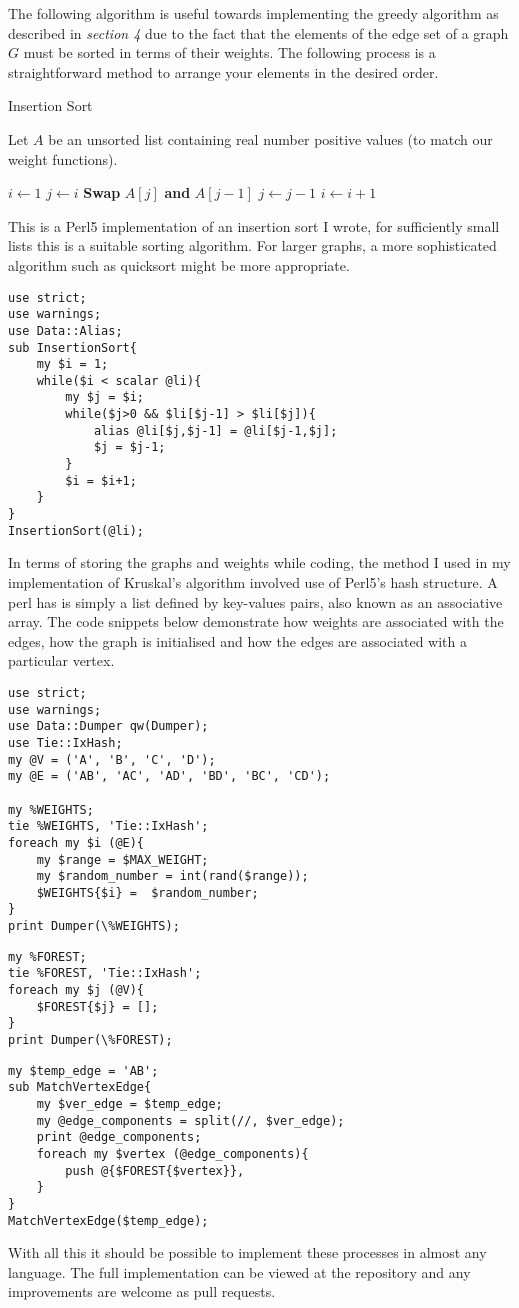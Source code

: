 \documentclass[../main.tex]{subfiles}
\begin{document}
The following algorithm is useful towards implementing the greedy algorithm as described in \textit{section 4} due to the fact that the elements of the edge set of a graph $G$ must be sorted in terms of their weights. The following process is a straightforward method to arrange your elements in the desired order.

\begin{algorithm}[H]
\caption{Insertion Sort}\label{sorting}
Let $A$ be an unsorted list containing real number positive values (to match our weight functions).
\begin{algorithmic}[1]
\State $i \gets 1$
\State $j \gets i$
	\State  \textbf{Swap} $A[j]$ \textbf{and} $A[j-1]$
	\State $j \gets j-1$	
	\EndWhile
	\State $i \gets i+1$
\EndWhile
\EndProcedure
\end{algorithmic}
\end{algorithm}
This is a Perl5 implementation of an insertion sort I wrote, for sufficiently small lists this is a suitable sorting algorithm. For larger graphs, a more sophisticated algorithm such as quicksort might be more appropriate.
\begin{lstlisting}
use strict;
use warnings;
use Data::Alias;
sub InsertionSort{
	my $i = 1;
	while($i < scalar @li){
		my $j = $i;
		while($j>0 && $li[$j-1] > $li[$j]){
			alias @li[$j,$j-1] = @li[$j-1,$j];
			$j = $j-1;
		}
		$i = $i+1;
	}
}
InsertionSort(@li);
\end{lstlisting}

In terms of storing the graphs and weights while coding, the method I used in my implementation of Kruskal's algorithm involved use of Perl5's hash structure. A perl has is simply a list defined by key-values pairs, also known as an associative array. The code snippets below demonstrate how weights are associated with the edges, how the graph is initialised and how the edges are associated with a particular vertex.
\begin{lstlisting}
use strict;
use warnings;
use Data::Dumper qw(Dumper);
use Tie::IxHash;
my @V = ('A', 'B', 'C', 'D');
my @E = ('AB', 'AC', 'AD', 'BD', 'BC', 'CD');

my %WEIGHTS;
tie %WEIGHTS, 'Tie::IxHash';
foreach my $i (@E){
  	my $range = $MAX_WEIGHT;
  	my $random_number = int(rand($range));
	$WEIGHTS{$i} =  $random_number;
}
print Dumper(\%WEIGHTS);
\end{lstlisting}
\begin{lstlisting}
my %FOREST;
tie %FOREST, 'Tie::IxHash';
foreach my $j (@V){
	$FOREST{$j} = [];
}
print Dumper(\%FOREST);
\end{lstlisting}
\begin{lstlisting}
my $temp_edge = 'AB';
sub MatchVertexEdge{
	my $ver_edge = $temp_edge;
	my @edge_components = split(//, $ver_edge);
	print @edge_components;
	foreach my $vertex (@edge_components){
		push @{$FOREST{$vertex}}, 
	}
}
MatchVertexEdge($temp_edge);
\end{lstlisting}

With all this it should be possible to implement these processes in almost any language. The full implementation can be viewed at the repository\cite{github} and any improvements are welcome as pull requests.
\end{document}
